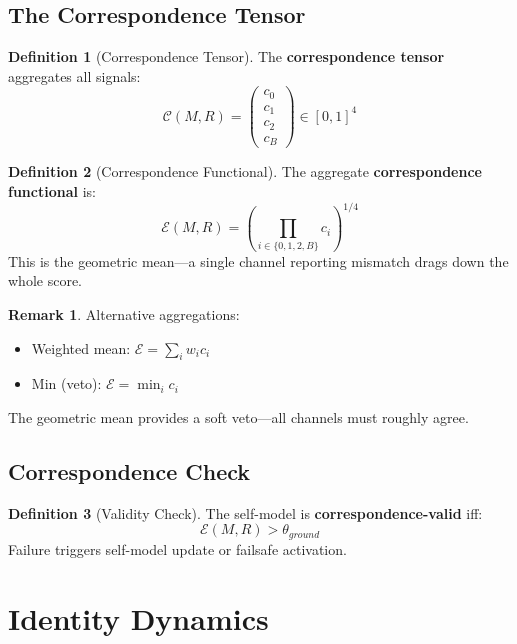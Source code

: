 \documentclass[12pt,a4paper]{article}
\theoremstyle{definition}
\newtheorem{definition}{Definition}[section]
\newtheorem{remark}{Remark}[section]
\begin{document}
\subsection{The Correspondence Tensor}

\begin{definition}[Correspondence Tensor]
The \textbf{correspondence tensor} aggregates all signals:
\[ \mathcal{C}(M, R) = \begin{pmatrix} c_0 \\ c_1 \\ c_2 \\ c_B \end{pmatrix} \in [0,1]^4 \]
\end{definition}

\begin{definition}[Correspondence Functional]
The aggregate \textbf{correspondence functional} is:
\[ \mathcal{E}(M, R) = \left( \prod_{i \in \{0,1,2,B\}} c_i \right)^{1/4} \]
This is the geometric mean---a single channel reporting mismatch drags down the whole score.
\end{definition}

\begin{remark}
Alternative aggregations:
\begin{itemize}
    \item Weighted mean: $\mathcal{E} = \sum_i w_i c_i$
    \item Min (veto): $\mathcal{E} = \min_i c_i$
\end{itemize}
The geometric mean provides a soft veto---all channels must roughly agree.
\end{remark}

\subsection{Correspondence Check}

\begin{definition}[Validity Check]
The self-model is \textbf{correspondence-valid} iff:
\[ \mathcal{E}(M, R) > \theta_{ground} \]
Failure triggers self-model update or failsafe activation.
\end{definition}

\section{Identity Dynamics}
\end{document}
